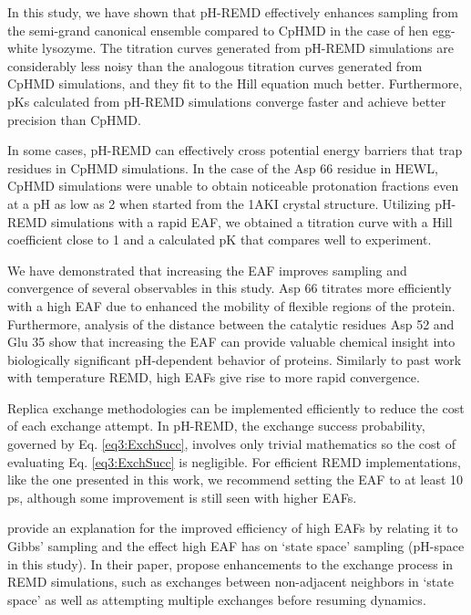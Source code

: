 In this study, we have shown that pH-REMD effectively enhances sampling from the
semi-grand canonical ensemble compared to CpHMD in the case of hen egg-white
lysozyme.  The titration curves generated from pH-REMD simulations are
considerably less noisy than the analogous titration curves generated from CpHMD
simulations, and they fit to the Hill equation much better.  Furthermore,
pKs calculated from pH-REMD simulations converge faster and achieve
better precision than CpHMD.

In some cases, pH-REMD can effectively cross potential energy barriers that trap
residues in CpHMD simulations.  In the case of the Asp 66 residue in HEWL, CpHMD
simulations were unable to obtain noticeable protonation fractions even at a pH
as low as 2 when started from the 1AKI crystal structure.  Utilizing pH-REMD
simulations with a rapid EAF, we obtained a titration curve with a Hill
coefficient close to 1 and a calculated pK that compares well to
experiment.

We have demonstrated that increasing the EAF improves sampling and convergence
of several observables in this study.  Asp 66 titrates more efficiently with a
high EAF due to enhanced the mobility of flexible regions of the protein.
Furthermore, analysis of the distance between the catalytic residues Asp 52 and
Glu 35 show that increasing the EAF can provide valuable chemical insight into
biologically significant pH-dependent behavior of proteins.  Similarly to past
work with temperature REMD, \cite{Sindhikara2008,Sindhikara2010} high EAFs give
rise to more rapid convergence.

Replica exchange methodologies can be implemented efficiently to reduce the cost
of each exchange attempt.  In pH-REMD, the exchange success probability,
governed by Eq. \ref{eq3:ExchSucc}, involves only trivial mathematics so the
cost of evaluating Eq. \ref{eq3:ExchSucc} is negligible.  For efficient REMD
implementations, like the one presented in this work, we recommend setting the
EAF to at least 10 ps, although some improvement is still seen with
higher EAFs.

\citeauthor{Chodera_JChemPhys_2011_v135_p194110}
\cite{Chodera_JChemPhys_2011_v135_p194110} provide an explanation for the
improved efficiency of high EAFs by relating it to Gibbs' sampling and the
effect high EAF has on `state space' sampling (pH-space in this study).  In
their paper, \citeauthor{Chodera_JChemPhys_2011_v135_p194110} propose
enhancements to the exchange process in REMD simulations, such as exchanges
between non-adjacent neighbors in `state space' as well as attempting multiple
exchanges before resuming dynamics. \cite{Chodera_JChemPhys_2011_v135_p194110}

